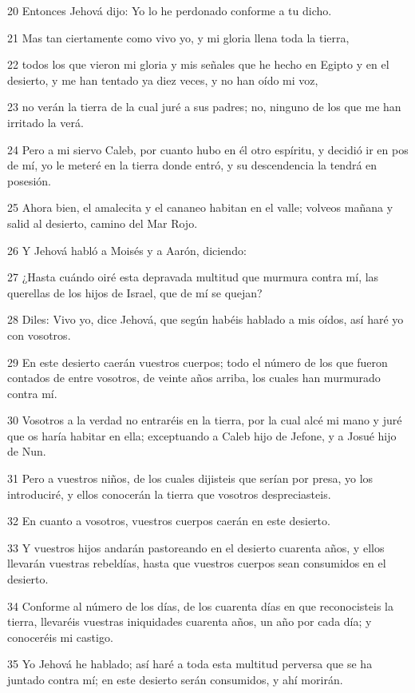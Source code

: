 \par 20 Entonces Jehová dijo: Yo lo he perdonado conforme a tu dicho.
\par 21 Mas tan ciertamente como vivo yo, y mi gloria llena toda la tierra,
\par 22 todos los que vieron mi gloria y mis señales que he hecho en Egipto y en el desierto, y me han tentado ya diez veces, y no han oído mi voz,
\par 23 no verán la tierra de la cual juré a sus padres; no, ninguno de los que me han irritado la verá.
\par 24 Pero a mi siervo Caleb, por cuanto hubo en él otro espíritu, y decidió ir en pos de mí, yo le meteré en la tierra donde entró, y su descendencia la tendrá en posesión.
\par 25 Ahora bien, el amalecita y el cananeo habitan en el valle; volveos mañana y salid al desierto, camino del Mar Rojo.
\par 26 Y Jehová habló a Moisés y a Aarón, diciendo:
\par 27 ¿Hasta cuándo oiré esta depravada multitud que murmura contra mí, las querellas de los hijos de Israel, que de mí se quejan?
\par 28 Diles: Vivo yo, dice Jehová, que según habéis hablado a mis oídos, así haré yo con vosotros. 
\par 29 En este desierto caerán vuestros cuerpos; todo el número de los que fueron contados de entre vosotros, de veinte años arriba, los cuales han murmurado contra mí.
\par 30 Vosotros a la verdad no entraréis en la tierra, por la cual alcé mi mano y juré que os haría habitar en ella; exceptuando a Caleb hijo de Jefone, y a Josué hijo de Nun.
\par 31 Pero a vuestros niños, de los cuales dijisteis que serían por presa, yo los introduciré, y ellos conocerán la tierra que vosotros despreciasteis.
\par 32 En cuanto a vosotros, vuestros cuerpos caerán en este desierto.
\par 33 Y vuestros hijos andarán pastoreando en el desierto cuarenta años, y ellos llevarán vuestras rebeldías, hasta que vuestros cuerpos sean consumidos en el desierto.
\par 34 Conforme al número de los días, de los cuarenta días en que reconocisteis la tierra, llevaréis vuestras iniquidades cuarenta años, un año por cada día; y conoceréis mi castigo.
\par 35 Yo Jehová he hablado; así haré a toda esta multitud perversa que se ha juntado contra mí; en este desierto serán consumidos, y ahí morirán.

